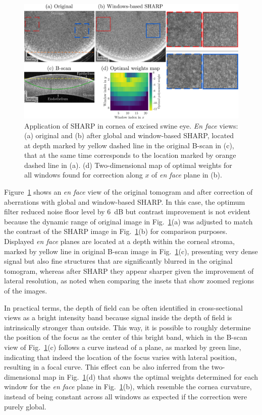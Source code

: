 \begin{figure}[b!]
	\centering
	\includegraphics[width=\textwidth]{Figures/Results/CorneaImaging.pdf}
	\caption[Application of SHARP in cornea of excised swine eye.]{Application of SHARP in cornea of excised swine eye. \textit{En face} views: (a) original and (b) after global and window-based SHARP, located at depth marked by yellow dashed line in the original B-scan in (c), that at the same time corresponds to the location marked by orange dashed line in (a). (d) Two-dimensional map of optimal 
	weights for all windows found for correction along $x$ of \textit{en face} plane in (b).}
	\label{fig:ConrealImaging}
\end{figure}

Figure~\ref{fig:ConrealImaging} shows an \textit{en face} view of the original tomogram and after correction of aberrations with global and window-based SHARP. In this case, the optimum filter reduced noise floor level by 6~dB but contrast improvement is not evident because the dynamic range of original image in Fig.~\ref{fig:ConrealImaging}(a) was adjusted to match the contrast of the SHARP image in Fig.~\ref{fig:ConrealImaging}(b) for comparison purposes. Displayed \textit{en face} planes are located at a depth within the corneal stroma, marked by yellow line in original B-scan image in Fig.~\ref{fig:ConrealImaging}(c), presenting very dense signal but also fine structures that are significantly blurred in the original tomogram, whereas after SHARP they appear sharper given the improvement of lateral resolution, as noted when comparing the insets that show zoomed regions of the images.

In practical terms, the depth of field can be often identified in cross-sectional views as a bright intensity band because signal inside the depth of field is intrinsically stronger than outside. This way, it is possible to roughly determine the position of the focus as the center of this bright band, which in the B-scan view of Fig.~\ref{fig:ConrealImaging}(c) follows a curve instead of a plane, as marked by green line, indicating that indeed the location of the focus varies with lateral position, resulting in a focal curve. This effect can be also inferred from the two-dimensional map in Fig.~\ref{fig:ConrealImaging}(d) that shows the optimal weights determined for each window for the \textit{en face} plane in Fig.~\ref{fig:ConrealImaging}(b), which resemble the cornea curvature, instead of being constant across all windows as expected if the correction were purely global.


